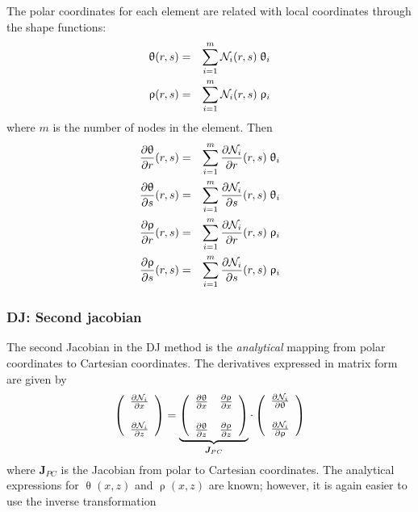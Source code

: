 The polar coordinates for each element are related with local coordinates through the shape functions:
\begin{eqnarray}
\uptheta(r,s) &=& \sum_{i=1}^m {\mathcal{N}}_i(r,s) \; \uptheta_i\\
\uprho(r,s) &=&  \sum_{i=1}^m {\mathcal{N}}_i(r,s) \; \uprho_i
\end{eqnarray}
where $m$ is the number of nodes in the element.
Then
\begin{eqnarray}
\frac{\partial\uptheta}{\partial r}(r,s) &=& \sum_{i=1}^m \frac{\partial{\mathcal{N}}_i}{\partial r}(r,s)\; \uptheta_i\\
\frac{\partial\uptheta}{\partial s}(r,s) &=& \sum_{i=1}^m \frac{\partial{\mathcal{N}}_i}{\partial s}(r,s)\; \uptheta_i\\
\frac{\partial\uprho}{\partial r}(r,s)   &=& \sum_{i=1}^m \frac{\partial{\mathcal{N}}_i}{\partial r}(r,s)\; \uprho_i \\
\frac{\partial\uprho}{\partial s}(r,s)   &=& \sum_{i=1}^m \frac{\partial{\mathcal{N}}_i}{\partial s}(r,s)\; \uprho_i
\end{eqnarray}



\subsubsection{DJ: Second jacobian}

The second Jacobian in the DJ method is the {\it analytical} 
mapping from polar coordinates to Cartesian coordinates. The derivatives 
expressed in matrix form are given by
\begin{equation}
\left(
\begin{array}{c}
\frac{\partial {\mathcal{N}}_i}{\partial x} \\ \\
\frac{\partial {\mathcal{N}}_i}{\partial z} 
\end{array}
\right)
= 
\underbrace{\left(
\begin{array}{cc}
\frac{\partial \uptheta}{\partial x}  & 
\frac{\partial \uprho}{\partial x}   \\ \\
\frac{\partial \uptheta}{\partial z}  & 
\frac{\partial \uprho}{\partial z}  
\end{array}
\right)}_{{\bm J}_{PC}}
\cdot
\left(
\begin{array}{c}
\frac{\partial {\mathcal{N}}_i}{\partial \uptheta} \\ \\
\frac{\partial {\mathcal{N}}_i}{\partial \uprho} 
\end{array}
\right)
\label{eq:DJ3}
\end{equation}
where ${\bm J}_{PC}$ is the Jacobian from polar to Cartesian coordinates. The analytical expressions for 
$\uptheta(x,z)$ and $\uprho(x,z)$ are known; however, it is again easier to use the inverse transformation

